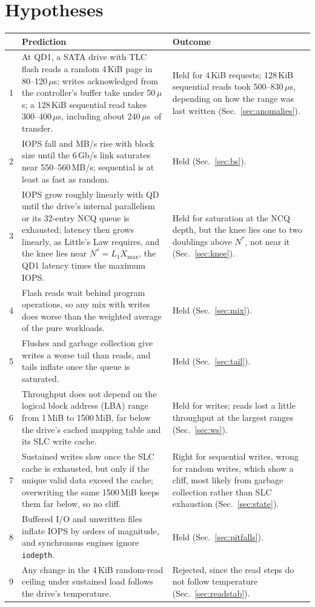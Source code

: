 \documentclass{article}
\newcommand{\us}{\,$\mu$s}
\begin{document}
\section{Hypotheses}\label{sec:hyp}
{\small
\begin{longtable}{@{}lp{7.7cm}p{7.7cm}@{}}
\toprule
& \textbf{Prediction} & \textbf{Outcome} \\
\midrule
\endhead
1 & At QD1, a SATA drive with TLC flash reads a random 4\,KiB page in 80--120\us; writes acknowledged from the controller's buffer take under 50\us; a 128\,KiB sequential read takes 300--400\us, including about 240\us\ of transfer. & Held for 4\,KiB requests; 128\,KiB sequential reads took 500--830\us, depending on how the range was last written (Sec.~\ref{sec:anomalies}). \\
2 & IOPS fall and MB/s rise with block size until the 6\,Gb/s link saturates near 550--560\,MB/s; sequential is at least as fast as random. & Held (Sec.~\ref{sec:bs}). \\
3 & IOPS grow roughly linearly with QD until the drive's internal parallelism or its 32-entry NCQ queue is exhausted; latency then grows linearly, as Little's Law requires, and the knee lies near $N^{*}=L_{1}X_{\max}$, the QD1 latency times the maximum IOPS. & Held for saturation at the NCQ depth, but the knee lies one to two doublings above $N^{*}$, not near it (Sec.~\ref{sec:knee}). \\
4 & Flash reads wait behind program operations, so any mix with writes does worse than the weighted average of the pure workloads. & Held (Sec.~\ref{sec:mix}). \\
5 & Flushes and garbage collection give writes a worse tail than reads, and tails inflate once the queue is saturated. & Held (Sec.~\ref{sec:tail}). \\
6 & Throughput does not depend on the logical block address (LBA) range from 1\,MiB to 1500\,MiB, far below the drive's cached mapping table and its SLC write cache. & Held for writes; reads lost a little throughput at the largest ranges (Sec.~\ref{sec:ws}). \\
7 & Sustained writes slow once the SLC cache is exhausted, but only if the unique valid data exceed the cache; overwriting the same 1500\,MiB keeps them far below, so no cliff. & Right for sequential writes, wrong for random writes, which show a cliff, most likely from garbage collection rather than SLC exhaustion (Sec.~\ref{sec:state}). \\
8 & Buffered I/O and unwritten files inflate IOPS by orders of magnitude, and synchronous engines ignore \texttt{iodepth}. & Held (Sec.~\ref{sec:pitfalls}). \\
9 & Any change in the 4\,KiB random-read ceiling under sustained load follows the drive's temperature. & Rejected, since the read steps do not follow temperature (Sec.~\ref{sec:readstab}). \\
\bottomrule
\end{longtable}
}
\end{document}
